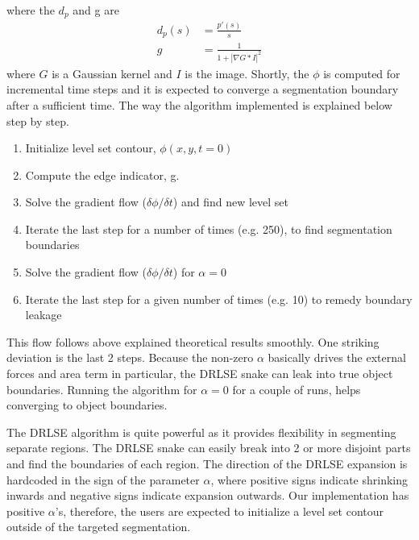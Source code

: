 \documentclass{article}
\begin{document}
where the $d_p$ and g are 
\begin{align*}
d_p(s)&=\frac{p'(s)}{s}\\
g &= \frac{1}{1+|\nabla G * I|^2}
\end{align*}
where $G$ is a Gaussian kernel and $I$ is the image. Shortly, the $\phi$ is computed for incremental time steps and it is expected to converge a segmentation boundary after a sufficient time. The way the algorithm implemented is explained below step by step.
\begin{enumerate}
\item Initialize level set contour, $\phi (x,y, t=0)$
\item Compute the edge indicator, g.
\item Solve the gradient flow ($\delta \phi / \delta t$) and find new level set
\item Iterate the last step for a number of times (e.g. 250), to find segmentation boundaries
\item Solve the gradient flow ($\delta \phi / \delta t$)  for $\alpha=0$
\item Iterate the last step for a given number of times (e.g. 10) to remedy boundary leakage
\end{enumerate}
This flow follows above explained theoretical results smoothly. One striking deviation is the last 2 steps. Because the non-zero $\alpha$ basically drives the external forces and area term in particular, the DRLSE snake can leak into true object boundaries. Running the algorithm for $\alpha=0$ for a couple of runs, helps converging to object boundaries. 

The DRLSE algorithm is quite powerful as it provides flexibility in segmenting separate regions. The DRLSE snake can easily break into 2 or more disjoint parts and find the boundaries of each region. The direction of the DRLSE expansion is hardcoded in the sign of the parameter $\alpha$, where positive signs indicate shrinking inwards and negative signs indicate expansion outwards. Our implementation has positive $\alpha$'s, therefore, the users are expected to initialize a level set contour outside of the targeted segmentation.
\end{document}

